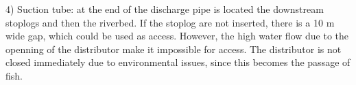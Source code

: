 


4) Suction tube: at the end of the discharge pipe is located the downstream
stoplogs and then the riverbed. If the stoplog are not inserted, there is a 10 m wide gap, which
could be used as access. However, the high water flow due to the
openning of the distributor make it impossible for access. The distributor is
not closed immediately due to environmental issues, since this becomes the
passage of fish.


